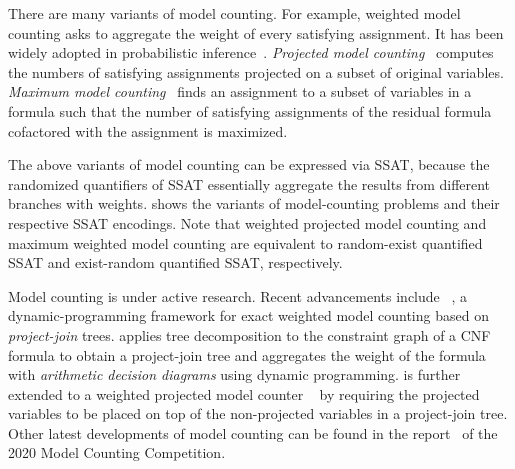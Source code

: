 There are many variants of model counting.
For example,
weighted model counting asks to aggregate the weight of every satisfying assignment.
It has been widely adopted in probabilistic inference~\cite{Sang2005BayesianInference,Chavira2008}.
\textit{Projected model counting}~\cite{Aziz2015} computes the numbers of satisfying assignments
projected on a subset of original variables.
\textit{Maximum model counting}~\cite{Fremont2017} finds an assignment to a subset of variables in a formula
such that the number of satisfying assignments of the residual formula cofactored with the assignment is maximized.

The above variants of model counting can be expressed via SSAT,
because the randomized quantifiers of SSAT essentially aggregate the results from different branches with weights.
 shows the variants of model-counting problems and their respective SSAT encodings.
Note that weighted projected model counting and maximum weighted model counting are equivalent to
random-exist quantified SSAT and exist-random quantified SSAT, respectively.

Model counting is under active research.
Recent advancements include \dpmc~\cite{Dudek2020},
a dynamic-programming framework for exact weighted model counting based on \textit{project-join} trees.
\dpmc applies tree decomposition to the constraint graph of a CNF formula to obtain a project-join tree
and aggregates the weight of the formula with \textit{arithmetic decision diagrams} using dynamic programming.
\dpmc is further extended to a weighted projected model counter \procount~\cite{Dudek2021}
by requiring the projected variables to be placed on top of the non-projected variables in a project-join tree.
Other latest developments of model counting can be found in the report~\cite{MC-COMP2020} of the 2020 Model Counting Competition.
